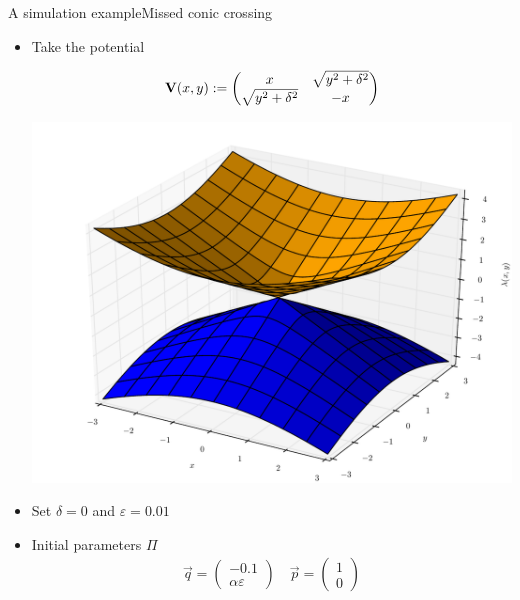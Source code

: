 \documentclass{beamer}
\begin{document}
\begin{frame}{A simulation example}{Missed conic crossing}
  \begin{itemize}
  \item Take the potential \\
    \begin{minipage}{0.6\linewidth}
      \begin{equation*}
        \mathbf{V}(x,y) :=
        \begin{pmatrix}
          x                   & \sqrt{y^2+\delta^2} \\
          \sqrt{y^2+\delta^2} & -x
        \end{pmatrix}
      \end{equation*}
    \end{minipage}
    \begin{minipage}{0.29\linewidth}
      \begin{center}
        \includegraphics[scale=0.15]{./fig/conic_intersection.pdf}
      \end{center}
    \end{minipage}
  \item Set $\delta = 0$ and $\varepsilon = 0.01$
  \item Initial parameters $\Pi$
    \begin{align*}
      \vec{q} = \begin{pmatrix}
        -0.1 \\ \alpha \varepsilon
      \end{pmatrix}
      \quad
      \vec{p} = \begin{pmatrix}
        1 \\ 0

\end{pmatrix}
\end{align*}
\end{itemize}
\end{frame}
\end{document}
